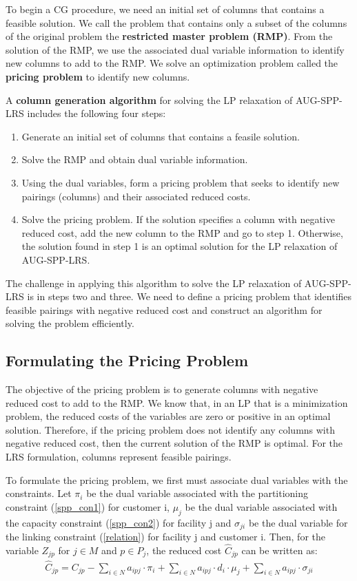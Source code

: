 To begin a CG procedure, we need an initial set of columns that contains a feasible 
solution. We call the problem that contains only a subset of the columns of the original 
problem the {\bf restricted master problem (RMP)}. From the solution of the RMP, we use 
the associated dual variable information to identify new columns to add to the RMP. We 
solve an optimization problem called the {\bf pricing problem} to identify new columns.

A {\bf column generation algorithm} for solving the LP relaxation of AUG-SPP-LRS 
includes the following four steps: 

\begin{enumerate}
\item[0.] Generate an initial set of columns that contains a feasile solution.
\item[1.] Solve the RMP and obtain dual variable information.
\item[2.] Using the dual variables, form a pricing problem that seeks to identify 
new pairings (columns) and their associated reduced costs. 
\item[3.] Solve the pricing problem. If the solution specifies a column with negative
reduced cost, add the new column to the RMP and go to step 1. Otherwise, the 
solution found in step 1 is an optimal solution for the LP relaxation of AUG-SPP-LRS.
\end {enumerate}

The challenge in applying this algorithm to solve the LP relaxation of AUG-SPP-LRS 
is in steps two and three. We need to define a pricing problem that identifies
feasible pairings with negative reduced cost and construct an algorithm for
solving the problem efficiently.
  
\subsection {Formulating the Pricing Problem}
\label{form-pricing-prob}
The objective of the pricing problem is to generate columns with 
negative reduced cost to add to the RMP. We know that, in an
LP that is a minimization problem, the reduced costs of the variables
are zero or positive in an optimal solution. Therefore, if the pricing problem does not
identify any columns with negative reduced cost, then the current  
solution of the RMP is optimal. For the LRS formulation, columns represent feasible 
pairings.

To formulate the pricing problem, we first must associate dual variables  
with the constraints. Let $\pi_{i}$ be the dual variable associated with the
partitioning constraint (\ref{spp_con1}) for customer i, $\mu_{j}$ be 
the dual variable associated with the capacity constraint (\ref{spp_con2}) 
for facility j and $\sigma_{ji}$ be the dual variable for the linking 
constraint (\ref{relation}) for facility j and customer i. Then, for the 
variable $Z_{jp}$ for $j \in M$ and $p \in P_{j}$, the reduced cost $\hat{C}_{jp}$
can be written as:   
\begin{eqnarray}
\label{red-cost}
\hat{C}_{jp}=C_{jp}-\sum_{i\in N}a_{ipj}\cdot \pi_{i}+\sum_{i \in N}a_{ipj} \cdot d_{i} \cdot \mu_{j}+\sum_{i \in N}a_{ipj} \cdot \sigma_{ji}
\end{eqnarray} 

